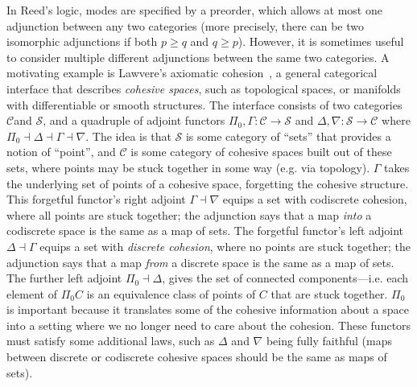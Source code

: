 \documentclass{drl-common/llncs}
\newcommand{\C}{\ensuremath{\mathcal{C}}}
\newcommand{\la}{\ensuremath{\dashv}}
\begin{document}
In Reed's logic, modes are specified by a preorder, which allows at most
one adjunction between any two categories (more precisely, there can be
two isomorphic adjunctions if both $p \ge q$ and $q \ge p$).  However,
it is sometimes useful to consider multiple different adjunctions
between the same two categories.  A motivating example is Lawvere's
axiomatic cohesion~\citep{lawvere07cohesion}, a general categorical
interface that describes \emph{cohesive spaces}, such as topological
spaces, or manifolds with differentiable or smooth structures.  The
interface consists of two categories \C and $\mathcal{S}$, and a
quadruple of adjoint functors $\Pi_0,\Gamma : \mathcal{C} \to
\mathcal{S}$ and $\Delta,\nabla : \mathcal{S} \to \mathcal{C}$ where
$\Pi_0 \la \Delta \la \Gamma \la \nabla$.  The idea is that
$\mathcal{S}$ is some category of ``sets'' that provides a notion of
``point'', and \C\/ is some category of cohesive spaces built out of
these sets, where points may be stuck together in some way (e.g. via
topology).  $\Gamma$ takes the underlying set of points of a cohesive
space, forgetting the cohesive structure.  This forgetful functor's
right adjoint $\Gamma \la \nabla$ equips a set with codiscrete cohesion,
where all points are stuck together; the adjunction says that a map
\emph{into} a codiscrete space is the same as a map of sets.  The
forgetful functor's left adjoint $\Delta \la \Gamma$ equips a set with
\emph{discrete cohesion}, where no points are stuck together; the
adjunction says that a map \emph{from} a discrete space is the same as a
map of sets.  The further left adjoint $\Pi_0 \la \Delta$, gives the set
of connected components---i.e. each element of $\Pi_0 C$ is an
equivalence class of points of $C$ that are stuck together.  $\Pi_0$ is
important because it translates some of the cohesive information about a
space into a setting where we no longer need to care about the cohesion.
These functors must satisfy some additional laws, such as $\Delta$ and
$\nabla$ being fully faithful (maps between discrete or codiscrete
cohesive spaces should be the same as maps of sets).
\end{document}
